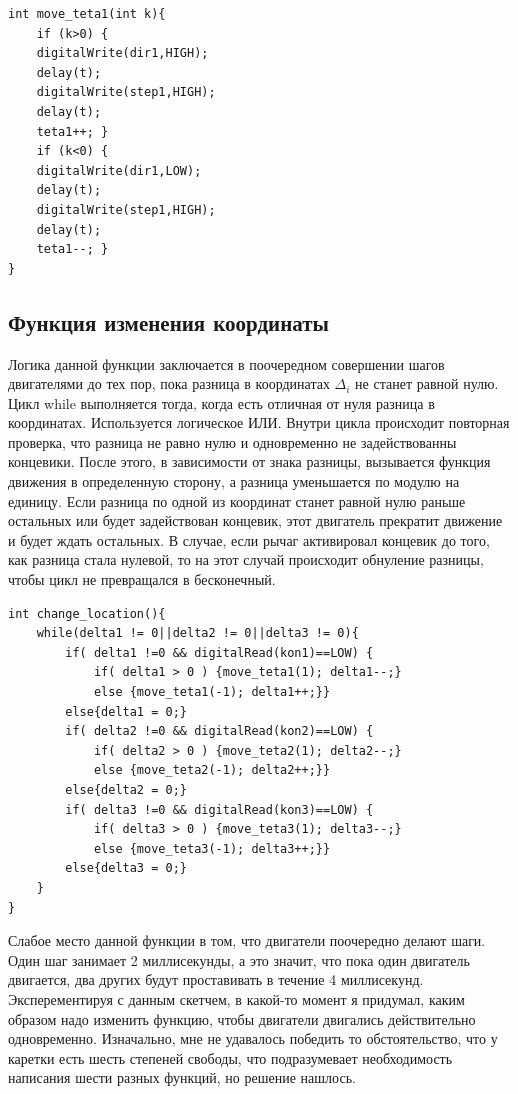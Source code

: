 \begin{lstlisting}[style=uno,caption=Функция управляющяя шаговым двигателем]
int move_teta1(int k){
    if (k>0) {
    digitalWrite(dir1,HIGH);
    delay(t);
    digitalWrite(step1,HIGH);
    delay(t);
    teta1++; }
    if (k<0) {
    digitalWrite(dir1,LOW);
    delay(t);
    digitalWrite(step1,HIGH);
    delay(t);
    teta1--; }
}
\end{lstlisting}

\subsection{Функция изменения координаты}

Логика данной функции заключается в поочередном совершении шагов двигателями до тех пор, пока разница в координатах $\Delta_{i}$ не станет равной нулю. Цикл while выполняется тогда, когда есть отличная от нуля разница в координатах. Используется логическое ИЛИ. Внутри цикла происходит повторная проверка, что разница не равно нулю и одновременно не задействованны концевики. После этого, в зависимости от знака разницы, вызывается функция движения в определенную сторону, а разница уменьшается по модулю на единицу. Если разница по одной из координат станет равной нулю раньше остальных или будет задействован концевик, этот двигатель прекратит движение и будет ждать остальных. В случае, если рычаг активировал концевик до того, как разница стала нулевой, то на этот случай происходит обнуление разницы, чтобы цикл не превращался в бесконечный.

\begin{lstlisting}[style=uno,caption=Функция изменения координаты]
int change_location(){
    while(delta1 != 0||delta2 != 0||delta3 != 0){
        if( delta1 !=0 && digitalRead(kon1)==LOW) {
            if( delta1 > 0 ) {move_teta1(1); delta1--;}
            else {move_teta1(-1); delta1++;}}
        else{delta1 = 0;}
        if( delta2 !=0 && digitalRead(kon2)==LOW) {
            if( delta2 > 0 ) {move_teta2(1); delta2--;}
            else {move_teta2(-1); delta2++;}}
        else{delta2 = 0;}
        if( delta3 !=0 && digitalRead(kon3)==LOW) {
            if( delta3 > 0 ) {move_teta3(1); delta3--;}
            else {move_teta3(-1); delta3++;}}
        else{delta3 = 0;}
    }
}
\end{lstlisting}

Слабое место данной функции в том, что двигатели поочередно делают шаги. Один шаг занимает 2 миллисекунды, а это значит, что пока один двигатель двигается, два других будут проставивать в течение 4 миллисекунд. Эксперементируя с данным скетчем, в какой-то момент я придумал, каким образом надо изменить функцию, чтобы двигатели двигались действительно одновременно. Изначально, мне не удавалось победить то обстоятельство, что у каретки есть шесть степеней свободы, что подразумевает необходимость написания шести разных функций, но решение нашлось.

